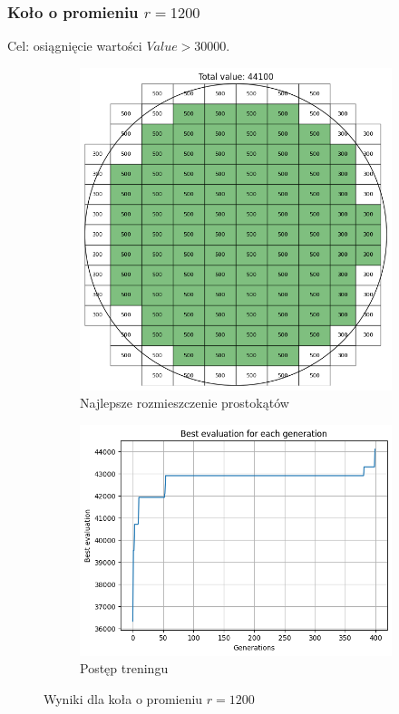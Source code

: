 \documentclass{article}
\begin{document}
\subsubsection*{Koło o promieniu $r=1200$}
Cel: osiągnięcie wartości $Value > 30000$.
\begin{figure}[H]
    \centering
    \begin{subfigure}{0.48\textwidth}
        \includegraphics[width=\linewidth]{img/ae2/r1200_fit.png}
        \caption{Najlepsze rozmieszczenie prostokątów}
    \end{subfigure}
    \hfill
    \begin{subfigure}{0.48\textwidth}
        \includegraphics[width=\linewidth]{img/ae2/r1200_history.png}
        \caption{Postęp treningu}
    \end{subfigure}
    \caption{Wyniki dla koła o promieniu $r=1200$}
\end{figure}
\newpage
\end{document}
